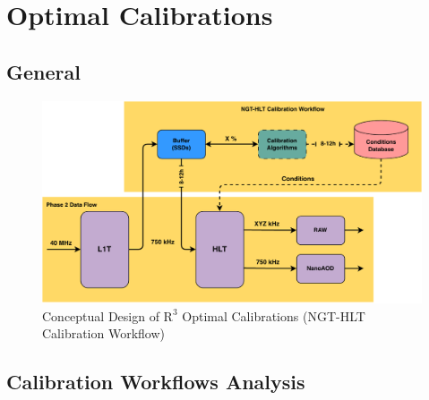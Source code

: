 \chapter{Optimal Calibrations}
\section{General} %



\begin{figure}[h!]	
\centering
\includegraphics[width=\textwidth]{figures/NGT-HLT_Calibration_Workflow.drawio.pdf} %
\caption{Conceptual Design of $\mathrm{R}^{3}$ Optimal Calibrations (NGT-HLT Calibration Workflow)}
\label{fig:NGT-HLT_CalibrationWorkflow}
\end{figure}

\section{Calibration Workflows Analysis}


